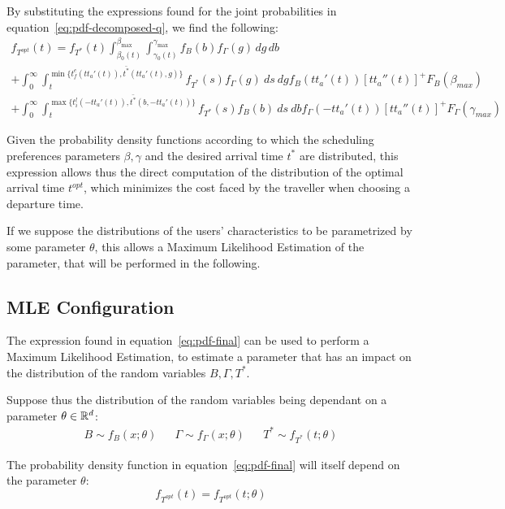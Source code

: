 By substituting the expressions found for the joint probabilities in equation~\eqref{eq:pdf-decomposed-q},
we find the following:
\begin{multline}
  \label{eq:pdf-final}
    f_{T^{opt}}(t) = f_{T^*}(t)\int_{\beta_0(t)}^{\beta_{\text{max}}}\int_{\gamma_0(t)}^{\gamma_{\text{max}}}f_B(b)f_\Gamma(g)\, dg\, db \\
    + \int_0^\infty \int_t^{\min\{t_f^e(tt_a'(t)), \bar{t^*}(tt_a'(t), g)\}}f_{T^*}(s) f_\Gamma(g)\ ds\ dg f_B(tt_a'(t)) [tt_a''(t)]^+F_B(\beta_{max}) \\
    + \int_0^\infty \int_t^{\max\{t_i^l(-tt_a'(t)), \bar{t^*}(b, -tt_a'(t))\}}f_{T^*}(s) f_B(b)\ ds\ db f_\Gamma(-tt_a'(t)) [tt_a''(t)]^+F_\Gamma(\gamma_{max})
\end{multline}

Given the probability density functions according to which the scheduling preferences parameters \(\beta, \gamma\) and the desired arrival time \(t^*\) are distributed,
this expression allows thus the direct computation of the distribution of the optimal arrival time \(t^{opt}\),
which minimizes the cost faced by the traveller when choosing a departure time.

If we suppose the distributions of the users' characteristics to be parametrized by some parameter \(\theta\),
this allows a Maximum Likelihood Estimation of the parameter,
that will be performed in the following.

\subsection{MLE Configuration}

The expression found in equation~\eqref{eq:pdf-final} can be used to perform a Maximum Likelihood Estimation,
to estimate a parameter that has an impact on the distribution of the random variables \(B, \Gamma, T^*\).

Suppose thus the distribution of the random variables being dependant on a parameter \(\theta \in \mathbb{R}^d\):
\begin{align*}
  B \sim f_B(x; \theta) && \Gamma \sim f_\Gamma(x; \theta) && T^* \sim f_{T^*}(t; \theta)
\end{align*}

The probability density function in equation~\eqref{eq:pdf-final} will itself depend on the parameter \(\theta\):
\begin{equation*}
  f_{T^{opt}}(t) = f_{T^{opt}}(t; \theta)
\end{equation*}


